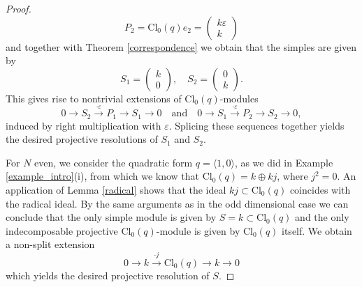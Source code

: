 \documentclass[a4paper, twoside, 11pt]{amsart}
\theoremstyle{definition}
\theoremstyle{remark}
\numberwithin{equation}{theorem}
\newcommand{\evencl}{\mathrm{Cl}_0}
\begin{document}
\begin{proof}
\begin{equation*}
        P_2 = \evencl(q)e_2 = \begin{pmatrix}k\varepsilon\\k\end{pmatrix}
    \end{equation*}
    and together with Theorem \ref{correspondence} we obtain that the simples are given by 
    \begin{equation*}
        S_1 = \begin{pmatrix}k\\0\end{pmatrix}, \quad S_2 = \begin{pmatrix}0\\k\end{pmatrix}.
    \end{equation*}
    This gives rise to nontrivial extensions of $\evencl(q)$-modules 
    \begin{equation*}
        0 \longrightarrow S_2 \overset{\cdot\varepsilon}{\longrightarrow} P_1 \longrightarrow S_1 \longrightarrow 0
        \quad \text{and} \quad 
        0 \longrightarrow S_1 \overset{\cdot\varepsilon}{\longrightarrow} P_2 \longrightarrow S_2 \longrightarrow 0,
    \end{equation*}
    induced by right multiplication with $\varepsilon$.
    Splicing these sequences together yields the desired projective resolutions of $S_1$ and $S_2$. 
    
    For $N$ even, we consider the quadratic form $q = \langle 1,0\rangle$, as we did in Example \ref{example_intro}(i), from which we know that $\evencl(q) = k \oplus kj$, where $j^2=0$. 
    An application of Lemma \ref{radical} shows that the 
    ideal $kj \subset \evencl(q)$ coincides with the radical ideal. By the same arguments as in the odd dimensional case we can conclude that the only simple module is given by $S =k \subset \evencl(q)$ and the only indecomposable projective $\evencl(q)$-module is given by $\evencl(q)$ itself. We obtain a non-split extension
    \begin{equation*}
        0 \longrightarrow k \overset{\cdot j}{\longrightarrow} \evencl(q) \longrightarrow k\longrightarrow 0
    \end{equation*}
    which yields the desired projective resolution of $S$.
\end{proof}
\end{document}
